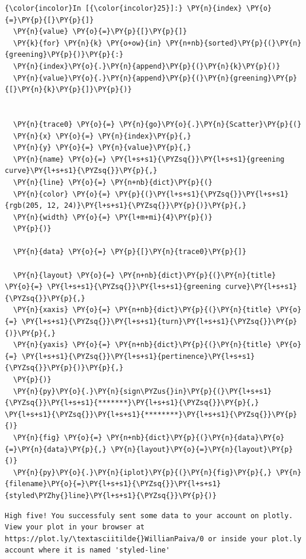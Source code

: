 \begin{Verbatim}[commandchars=\\\{\}]
  {\color{incolor}In [{\color{incolor}25}]:} \PY{n}{index} \PY{o}{=}\PY{p}{[}\PY{p}{]}
  \PY{n}{value} \PY{o}{=}\PY{p}{[}\PY{p}{]}
  \PY{k}{for} \PY{n}{k} \PY{o+ow}{in} \PY{n+nb}{sorted}\PY{p}{(}\PY{n}{greening}\PY{p}{)}\PY{p}{:}
  \PY{n}{index}\PY{o}{.}\PY{n}{append}\PY{p}{(}\PY{n}{k}\PY{p}{)}
  \PY{n}{value}\PY{o}{.}\PY{n}{append}\PY{p}{(}\PY{n}{greening}\PY{p}{[}\PY{n}{k}\PY{p}{]}\PY{p}{)}


  \PY{n}{trace0} \PY{o}{=} \PY{n}{go}\PY{o}{.}\PY{n}{Scatter}\PY{p}{(}
  \PY{n}{x} \PY{o}{=} \PY{n}{index}\PY{p}{,}
  \PY{n}{y} \PY{o}{=} \PY{n}{value}\PY{p}{,}
  \PY{n}{name} \PY{o}{=} \PY{l+s+s1}{\PYZsq{}}\PY{l+s+s1}{greening curve}\PY{l+s+s1}{\PYZsq{}}\PY{p}{,}
  \PY{n}{line} \PY{o}{=} \PY{n+nb}{dict}\PY{p}{(}
  \PY{n}{color} \PY{o}{=} \PY{p}{(}\PY{l+s+s1}{\PYZsq{}}\PY{l+s+s1}{rgb(205, 12, 24)}\PY{l+s+s1}{\PYZsq{}}\PY{p}{)}\PY{p}{,}
  \PY{n}{width} \PY{o}{=} \PY{l+m+mi}{4}\PY{p}{)}
  \PY{p}{)}

  \PY{n}{data} \PY{o}{=} \PY{p}{[}\PY{n}{trace0}\PY{p}{]}

  \PY{n}{layout} \PY{o}{=} \PY{n+nb}{dict}\PY{p}{(}\PY{n}{title} \PY{o}{=} \PY{l+s+s1}{\PYZsq{}}\PY{l+s+s1}{greening curve}\PY{l+s+s1}{\PYZsq{}}\PY{p}{,}
  \PY{n}{xaxis} \PY{o}{=} \PY{n+nb}{dict}\PY{p}{(}\PY{n}{title} \PY{o}{=} \PY{l+s+s1}{\PYZsq{}}\PY{l+s+s1}{turn}\PY{l+s+s1}{\PYZsq{}}\PY{p}{)}\PY{p}{,}
  \PY{n}{yaxis} \PY{o}{=} \PY{n+nb}{dict}\PY{p}{(}\PY{n}{title} \PY{o}{=} \PY{l+s+s1}{\PYZsq{}}\PY{l+s+s1}{pertinence}\PY{l+s+s1}{\PYZsq{}}\PY{p}{)}\PY{p}{,}
  \PY{p}{)}
  \PY{n}{py}\PY{o}{.}\PY{n}{sign\PYZus{}in}\PY{p}{(}\PY{l+s+s1}{\PYZsq{}}\PY{l+s+s1}{*******}\PY{l+s+s1}{\PYZsq{}}\PY{p}{,} \PY{l+s+s1}{\PYZsq{}}\PY{l+s+s1}{********}\PY{l+s+s1}{\PYZsq{}}\PY{p}{)}
  \PY{n}{fig} \PY{o}{=} \PY{n+nb}{dict}\PY{p}{(}\PY{n}{data}\PY{o}{=}\PY{n}{data}\PY{p}{,} \PY{n}{layout}\PY{o}{=}\PY{n}{layout}\PY{p}{)}
  \PY{n}{py}\PY{o}{.}\PY{n}{iplot}\PY{p}{(}\PY{n}{fig}\PY{p}{,} \PY{n}{filename}\PY{o}{=}\PY{l+s+s1}{\PYZsq{}}\PY{l+s+s1}{styled\PYZhy{}line}\PY{l+s+s1}{\PYZsq{}}\PY{p}{)}
\end{Verbatim}

\begin{Verbatim}[commandchars=\\\{\}]
  High five! You successfuly sent some data to your account on plotly. View your plot in your browser at https://plot.ly/\textasciitilde{}WillianPaiva/0 or inside your plot.ly account where it is named 'styled-line'
\end{Verbatim}

